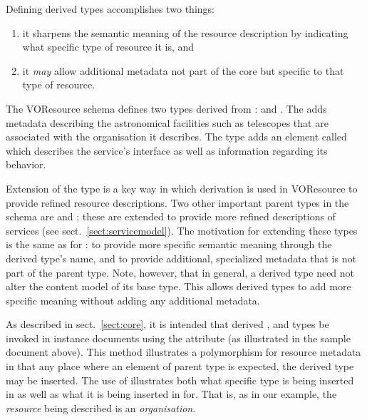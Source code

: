 \documentclass[11pt,a4paper]{ivoa}
\begin{document}
Defining derived  types accomplishes two
things:
\begin{enumerate}
  \item it sharpens the semantic meaning of the resource description by
       indicating what specific type of resource it is, and
  \item it \emph{may} allow additional metadata not part of the core
       but specific to that type of resource.
\end{enumerate}



The VOResource schema defines two types derived from
:   and
.   The  adds
metadata describing the astronomical facilities such as telescopes
that are associated with the organisation it describes.  The
 type adds an element called
 which describes the service's interface as
well as information regarding its behavior.



Extension of the  type is a key way in which
derivation is used in VOResource to provide refined resource
descriptions.  Two other important parent types in the schema are
 and ; these are
extended to provide more refined descriptions of services (see
sect.~\ref{sect:servicemodel}).  The motivation for extending
these types is the same as for : to provide
more specific semantic meaning through the derived type's name, and to
provide additional, specialized metadata that is not part of the
parent type.  Note, however, that in general, a derived type need not
alter the content model of its base type.  This allows derived types
to add more specific meaning without adding any additional metadata.



As described in sect.~\ref{sect:core}, it is intended that derived
,  and 
types be invoked in instance documents using the 
attribute (as illustrated in the sample document above).  This method
illustrates a polymorphism for resource metadata in that any place where
an element of parent type is expected, the derived type may be inserted.
The use of  illustrates both what specific type is being
inserted in as well as what it is being inserted in for.  That is, as in
our example, the \emph{resource} being described is an
\emph{organisation}.
\end{document}
